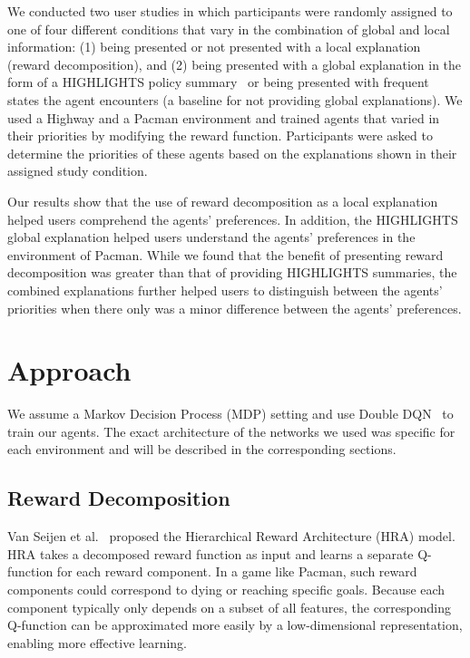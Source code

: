 \documentclass[runningheads]{llncs}
\newcommand{\shortcite}[1]{\cite{#1}}
\begin{document}
We conducted two user studies in which participants were randomly assigned to one of four different conditions that vary in the combination of global and local information: (1) being presented or not presented with a local explanation (reward decomposition), and (2) being presented with a global explanation in the form of a HIGHLIGHTS policy summary~\cite{amir2018highlights} or being presented with frequent states the agent encounters (a baseline for not providing global explanations).
We used a Highway and a Pacman environment and trained agents that varied in their priorities by modifying the reward function.
Participants were asked to determine the priorities of these agents based on the explanations shown in their assigned study condition.

Our results show that the use of reward decomposition as a local explanation helped users comprehend the agents' preferences.
In addition, the HIGHLIGHTS global explanation helped users understand the agents' preferences in the environment of Pacman.
While we found that the benefit of presenting reward decomposition was greater than that of providing HIGHLIGHTS summaries, the combined explanations further helped users to distinguish between the agents' priorities when there only was a minor difference between the agents' preferences.

\section{Approach}
\label{sec:background}



We assume a Markov Decision Process (MDP) setting and use Double DQN~\cite{van2016deep} to train our agents.
The exact architecture of the networks we used was specific for each environment and will be described in the corresponding sections.

\subsection{Reward Decomposition}

Van Seijen et al.~\shortcite{van2017hybrid} proposed the Hierarchical Reward Architecture (HRA) model. 
HRA takes a decomposed reward function as input and learns a separate Q-function for each reward component.
In a game like Pacman, such reward components could correspond to dying or reaching specific goals.
Because each component typically only depends on a subset of all features, the corresponding Q-function can be approximated more easily by a low-dimensional representation, enabling more effective learning.
\end{document}
